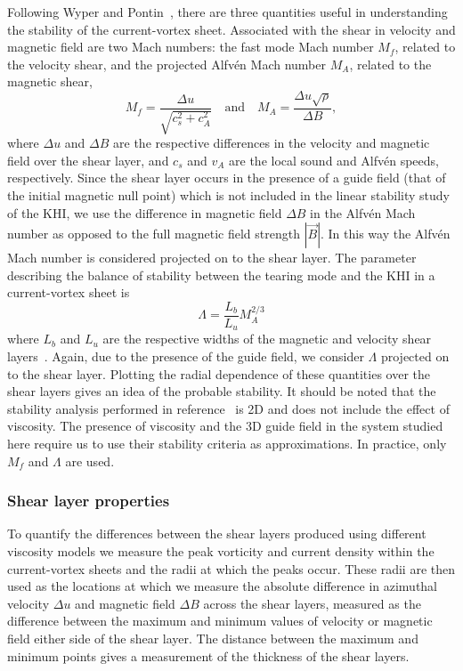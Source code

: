 Following Wyper and Pontin~\cite{wyperKelvinHelmholtzInstabilityCurrentvortex2013}, there are three quantities useful in understanding the stability of the current-vortex sheet. Associated with the shear in velocity and magnetic field are two Mach numbers: the fast mode Mach number $M_f$, related to the velocity shear, and the projected Alfv\'en Mach number $M_A$, related to the magnetic shear,
\begin{equation}
  \label{eq:mach_numbers}
  M_f = \frac{\Delta u}{\sqrt{c_s^2 + c_A^2}} \quad \text{and} \quad M_A = \frac{\Delta u \sqrt{\rho}}{\Delta B},
\end{equation}
where $\Delta u$ and $\Delta B$ are the respective differences in the velocity and magnetic field over the shear layer, and $c_s$ and $v_A$ are the local sound and Alfv\'en speeds, respectively. Since the shear layer occurs in the presence of a guide field (that of the initial magnetic null point) which is not included in the linear stability study of the KHI, we use the difference in magnetic field $\Delta B$ in the Alfv\'en Mach number as opposed to the full magnetic field strength $|\vec{B}|$. In this way the Alfv\'en Mach number is considered projected on to the shear layer. The parameter describing the balance of stability between the tearing mode and the KHI in a current-vortex sheet is
\begin{equation}
  \label{eq:khi_stability_param}
  \Lambda = \frac{L_b}{L_u} M_A^{2/3}
\end{equation}
where $L_b$ and $L_u$ are the respective widths of the magnetic and velocity shear layers~\cite{einaudiResistiveInstabilitiesFlowing1986}. Again, due to the presence of the guide field, we consider $\Lambda$ projected on to the shear layer. Plotting the radial dependence of these quantities over the shear layers gives an idea of the probable stability. It should be noted that the stability analysis performed in reference~\cite{einaudiResistiveInstabilitiesFlowing1986} is 2D and does not include the effect of viscosity. The presence of viscosity and the 3D guide field in the system studied here require us to use their stability criteria as approximations. In practice, only $M_f$ and $\Lambda$ are used.

\subsubsection{Shear layer properties}

To quantify the differences between the shear layers produced using different viscosity models we measure the peak vorticity and current density within the current-vortex sheets and the radii at which the peaks occur. These radii are then used as the locations at which we measure the absolute difference in azimuthal velocity $\Delta u$ and magnetic field $\Delta B$ across the shear layers, measured as the difference between the maximum and minimum values of velocity or magnetic field either side of the shear layer. The distance between the maximum and minimum points gives a measurement of the thickness of the shear layers.

